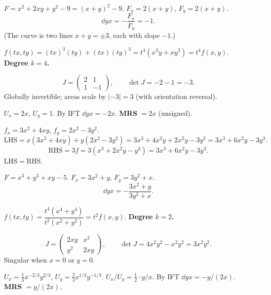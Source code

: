 \begin{solutions}
  \item $F=x^{2}+2xy+y^{2}-9=(x+y)^{2}-9$. $F_{x}=2(x+y)$,
        $F_{y}=2(x+y)$.
        \[
          \dd{y}{x}=-\frac{F_{x}}{F_{y}}=-1 .
        \]
        (The curve is two lines $x+y=\pm 3$, each with slope $-1$.)

  \item $f(tx,ty)=(tx)^{3}(ty)+(tx)(ty)^{3}=t^{4}(x^{3}y+xy^{3})
        =t^{4}f(x,y)$. \textbf{Degree $k=4$.}

  \item
        \[
          J=\begin{pmatrix} 2 & 1\\ 1 & -1\end{pmatrix},\qquad
          \det J=-2-1=-3 .
        \]
        Globally invertible; areas scale by $|{-3}|=3$ (with orientation
        reversal).

  \item $U_{x}=2x$, $U_{y}=1$. By IFT $\dd{y}{x}=-2x$. \textbf{MRS}
        $=2x$ (unsigned).

  \item $f_{x}=3x^{2}+4xy$, $f_{y}=2x^{2}-3y^{2}$.
        \[
          \mathrm{LHS}=x(3x^{2}+4xy)+y(2x^{2}-3y^{2})
          =3x^{3}+4x^{2}y+2x^{2}y-3y^{3}=3x^{3}+6x^{2}y-3y^{3} .
        \]
        \[
          \mathrm{RHS}=3f=3(x^{3}+2x^{2}y-y^{3})
          =3x^{3}+6x^{2}y-3y^{3} .
        \]
        $\mathrm{LHS}=\mathrm{RHS}$. \checkmark

  \item $F=x^{3}+y^{3}+xy-5$. $F_{x}=3x^{2}+y$, $F_{y}=3y^{2}+x$.
        \[
          \dd{y}{x}=-\frac{3x^{2}+y}{3y^{2}+x} .
        \]

  \item $f(tx,ty)=\dfrac{t^{4}(x^{4}+y^{4})}{t^{2}(x^{2}+y^{2})}
        =t^{2}f(x,y)$. \textbf{Degree $k=2$.}

  \item
        \[
          J=\begin{pmatrix} 2xy & x^{2}\\ y^{2} & 2xy\end{pmatrix},\qquad
          \det J=4x^{2}y^{2}-x^{2}y^{2}=3x^{2}y^{2} .
        \]
        Singular when $x=0$ or $y=0$.

  \item $U_{x}=\tfrac13 x^{-2/3}y^{2/3}$,
        $U_{y}=\tfrac23 x^{1/3}y^{-1/3}$.
        $U_{x}/U_{y}=\tfrac12\cdot y/x$. By IFT $\dd{y}{x}=-y/(2x)$.
        \textbf{MRS} $=y/(2x)$.


\end{solutions}
